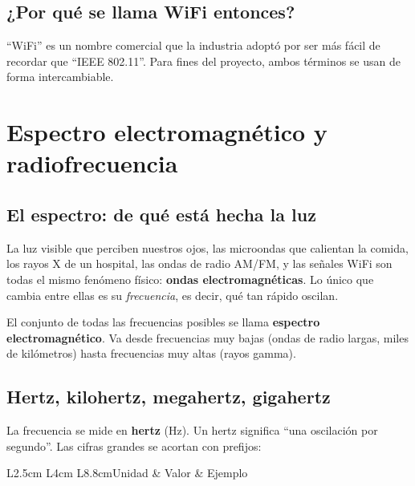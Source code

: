 \documentclass[11pt,a4paper]{article}
\begin{document}
\subsection{¿Por qué se llama WiFi entonces?}
``WiFi'' es un nombre comercial que la industria adoptó por ser más fácil de
recordar que ``IEEE 802.11''. Para fines del proyecto, ambos términos se
usan de forma intercambiable.

\section{Espectro electromagnético y radiofrecuencia}

\subsection{El espectro: de qué está hecha la luz}
La luz visible que perciben nuestros ojos, las microondas que calientan la
comida, los rayos X de un hospital, las ondas de radio AM/FM, y las señales
WiFi son todas el mismo fenómeno físico: \textbf{ondas electromagnéticas}.
Lo único que cambia entre ellas es su \emph{frecuencia}, es decir, qué tan
rápido oscilan.

El conjunto de todas las frecuencias posibles se llama \textbf{espectro
electromagnético}. Va desde frecuencias muy bajas (ondas de radio largas,
miles de kilómetros) hasta frecuencias muy altas (rayos gamma).

\subsection{Hertz, kilohertz, megahertz, gigahertz}
La frecuencia se mide en \textbf{hertz} (Hz). Un hertz significa ``una
oscilación por segundo''. Las cifras grandes se acortan con prefijos:

\begin{datatable}{L{2.5cm} L{4cm} L{8.8cm}}{Unidad & Valor & Ejemplo}
\end{datatable}
\end{document}
